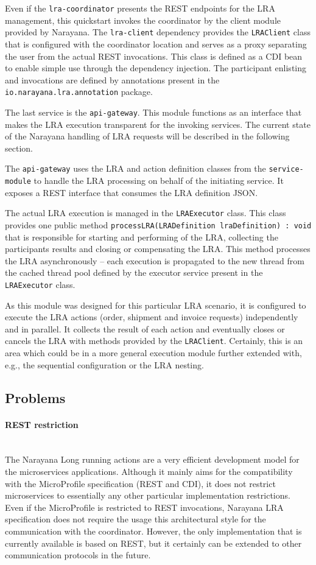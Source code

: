 \documentclass[oneside,
  digital, %
  table,   %
  lof,     %
  lot,     %
]{fithesis3}
\newcommand{\newlinepar}[1]{\paragraph{#1}\needspace{3\baselineskip}\mbox{}\\}
\begin{document}
Even if the \texttt{lra-coordinator} presents the REST endpoints for the LRA management, this quickstart invokes the coordinator by the client module provided by Narayana. The \texttt{lra-client} dependency provides the \texttt{LRAClient} class that is configured with the coordinator location and serves as a proxy separating the user from the actual REST invocations. This class is defined as a CDI bean to enable simple use through the dependency injection. The participant enlisting and invocations are defined by annotations present in the \texttt{io.narayana.lra.annotation} package.

The last service is the \texttt{api-gateway}. This module functions as an interface that makes the LRA execution transparent for the invoking services. The current state of the Narayana handling of LRA requests will be described in the following section.

The \texttt{api-gateway} uses the LRA and action definition classes from the \texttt{service-module} to handle the LRA processing on behalf of the initiating service. It exposes a REST interface that consumes the LRA definition JSON.

The actual LRA execution is managed in the \texttt{LRAExecutor} class. This class provides one public method \texttt{processLRA(LRADefinition lraDefinition) : void} that is responsible for starting and performing of the LRA, collecting the participants results and closing or compensating the LRA. This method processes the LRA asynchronously -- each execution is propagated to the new thread from the cached thread pool defined by the executor service present in the \texttt{LRAExecutor} class.

As this module was designed for this particular LRA scenario, it is configured to execute the LRA actions (order, shipment and invoice requests) independently and in parallel. It collects the result of each action and eventually closes or cancels the LRA with methods provided by the \texttt{LRAClient}. Certainly, this is an area which could be in a more general execution module further extended with, e.g., the sequential configuration or the LRA nesting.

\subsection{Problems}

\newlinepar{REST restriction}

The Narayana Long running actions are a very efficient development model for the microservices applications. Although it mainly aims for the compatibility with the MicroProfile specification (REST and CDI), it does not restrict microservices to essentially any other particular implementation restrictions. Even if the MicroProfile is restricted to REST invocations, Narayana LRA specification does not require the usage this architectural style for the communication with the coordinator. However, the only implementation that is currently available is based on REST, but it certainly can be extended to other communication protocols in the future.
\end{document}
